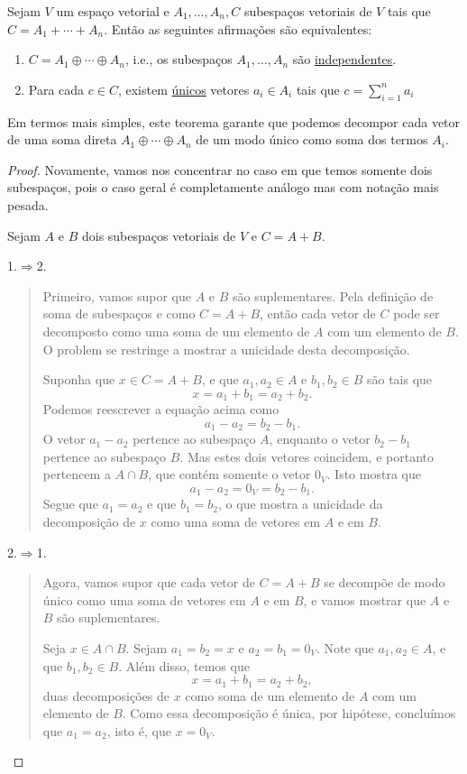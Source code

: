 \begin{theorem}
	Sejam $V$ um espaço vetorial e $A_1,\ldots,A_n,C$ subespaços vetoriais de $V$ tais que $C=A_1+\cdots+A_n$. Então as seguintes afirmações são equivalentes:
	\begin{enumerate}
		\item $C=A_1\oplus \cdots\oplus A_n$, i.e., os subespaços $A_1,\ldots,A_n$ são \href{http://mtm.ufsc.br/~cordeiro/ensino/mtm3112.algebra.linear/03.somas/con_subesp_indep_moodle.html}{independentes}.
		\item Para cada $c\in C$, existem \uline{únicos} vetores $a_i\in A_i$ tais que $c=\sum_{i=1}^n a_i$
	\end{enumerate}
\end{theorem}

Em termos mais simples, este teorema garante que podemos decompor cada vetor de uma soma direta $A_1\oplus\cdots\oplus A_n$ de um modo único como soma dos termos $A_i$.

\begin{proof}
	Novamente, vamos nos concentrar no caso em que temos somente dois subespaços, pois o caso geral é completamente análogo mas com notação mais pesada.
	
	Sejam $A$ e $B$ dois subespaços vetoriais de $V$ e $C=A+B$.
	
	1.$\Rightarrow$2.
	
	\begin{quote}
		Primeiro, vamos supor que $A$ e $B$ são suplementares. Pela definição de soma de subespaços e como $C=A+B$, então cada vetor de $C$ pode ser decomposto como uma soma de um elemento de $A$ com um elemento de $B$. O problem se restringe a mostrar a unicidade desta decomposição.
		
		Suponha que $x\in C=A+B$, e que $a_1,a_2\in A$ e $b_1,b_2\in B$ são tais que
		\[x=a_1+b_1=a_2+b_2.\]
		Podemos reescrever a equação acima como
		\[a_1-a_2=b_2-b_1.\]
		O vetor $a_1-a_2$ pertence ao subespaço $A$, enquanto o vetor $b_2-b_1$ pertence ao subespaço $B$. Mas estes dois vetores coincidem, e portanto pertencem a $A\cap B$, que contém somente o vetor $0_V$. Isto mostra que
		\[a_1-a_2=0_V=b_2-b_1.\]
		Segue que $a_1=a_2$ e que $b_1=b_2$, o que mostra a unicidade da decomposição de $x$ como uma soma de vetores em $A$ e em $B$.
	\end{quote}
	
	2.$\Rightarrow$1.
		
	\begin{quote}
		Agora, vamos supor que cada vetor de $C=A+B$ se decompõe de modo único como uma soma de vetores em $A$ e em $B$, e vamos mostrar que $A$ e $B$ são suplementares.
		
		Seja $x\in A\cap B$. Sejam $a_1=b_2=x$ e $a_2=b_1=0_V$. Note que $a_1,a_2\in A$, e que $b_1,b_2\in B$. Além disso, temos que
		\[x=a_1+b_1=a_2+b_2,\]
		duas decomposições de $x$ como soma de um elemento de $A$ com um elemento de $B$. Como essa decomposição é única, por hipótese, concluímos que $a_1=a_2$, isto é, que $x=0_V$.
	\end{quote}
\end{proof}